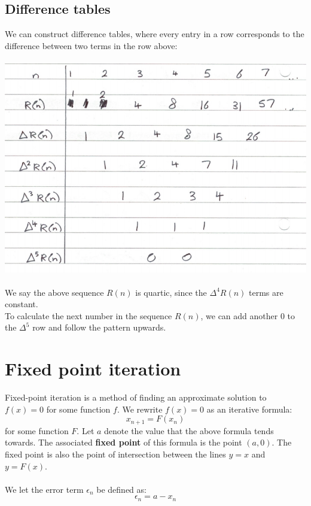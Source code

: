 \documentclass{scrartcl}
\begin{document}
\subsection{Difference tables}

We can construct difference tables, where every entry in a row corresponds to the difference between two terms in the row above:
\\\\
\includegraphics[scale=0.5]{differencetable}
\\\\
We say the above sequence $ R(n) $ is quartic, since the $ \Delta^{4}R(n) $ terms are constant.
\\
To calculate the next number in the sequence $ R(n) $, we can add another $ 0 $ to the $ \Delta^{5} $ row and follow the pattern upwards.

\section{Fixed point iteration}

Fixed-point iteration is a method of finding an approximate solution to $ f(x) = 0 $ for some function $ f $. We rewrite $ f(x) = 0 $ as an iterative formula:
\begin{equation}
x_{n+1} = F(x_{n})
\end{equation}
for some function $ F $. Let $ a $ denote the value that the above formula tends towards. The associated \textbf{fixed point} of this formula is the point $ (a, 0) $. The fixed point is also the point of intersection between the lines $ y = x $ and $ y = F(x) $.
\\\\
We let the error term $ \epsilon_{n} $ be defined as:
\begin{equation}
\epsilon_{n} = a - x_{n}
\end{equation}
\end{document}

